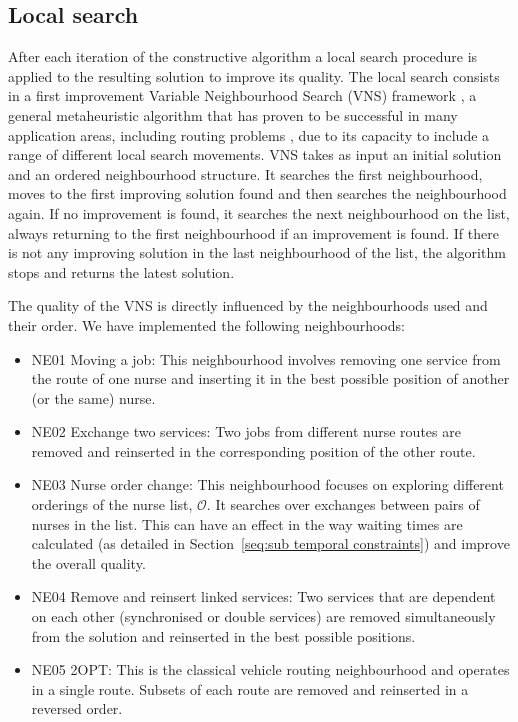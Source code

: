 \documentclass[a4paper,11pt]{elsarticle}
\begin{document}
\subsection{Local search}\label{subseq:local_search}
After each iteration of the constructive algorithm a local search procedure is applied to the resulting solution to improve its quality. The local search consists in a first improvement Variable Neighbourhood Search (VNS) framework \citep{Mladenovic1997}, a general metaheuristic algorithm that has proven to be successful in many application areas, including routing problems \cite{hansen2010variable}, due to its capacity to include a range of different local search movements. VNS takes as input an initial solution and an ordered neighbourhood structure. It searches the first neighbourhood, moves to the first improving solution found and then searches the neighbourhood again. If no improvement is found, it searches the next neighbourhood on the list, always returning to the first neighbourhood if an improvement is found. If there is not any improving solution in the last neighbourhood of the list, the algorithm stops and returns the latest solution.

The quality of the VNS is directly influenced by the neighbourhoods used and their order. We have implemented the following neighbourhoods:
\begin{itemize}
    \item NE01 Moving a job: This neighbourhood involves removing one service from the route of one nurse and inserting it in the best possible position of another (or the same) nurse.
    \item NE02 Exchange two services: Two jobs from different nurse routes are removed and reinserted in the corresponding position of the other route.
    \item NE03 Nurse order change: This neighbourhood focuses on exploring different orderings of the nurse list, $\mathcal{O}$. It searches over exchanges between pairs of nurses in the list. 
    This can have an effect in the way waiting times are calculated (as detailed in Section~\ref{seq:sub temporal constraints}) and improve the overall quality.
    \item NE04 Remove and reinsert linked services: Two services that are dependent on each other (synchronised or double services) are removed simultaneously from the solution and reinserted in the best possible positions.
    \item NE05 2OPT: This is the classical vehicle routing neighbourhood and operates in a single route. Subsets of each route are removed and reinserted in a reversed order.
\end{itemize}
\end{document}
